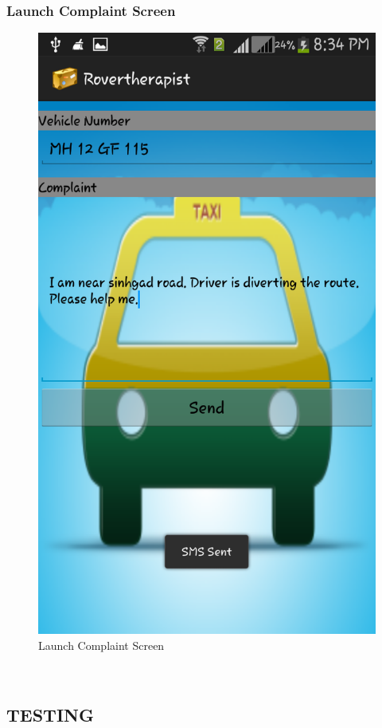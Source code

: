 \documentclass[12pt,a4paper]{article}
\begin{document}
\subsubsection{Launch Complaint Screen}
\begin{figure}[!htb]
\centering
\includegraphics[width=12 cm]{complaint}
\caption{Launch Complaint Screen}
\end{figure}
\\

\newpage
\pagestyle{plain}
\begin{center}
\section{TESTING}
\end{center} 
\\
\end{document}

